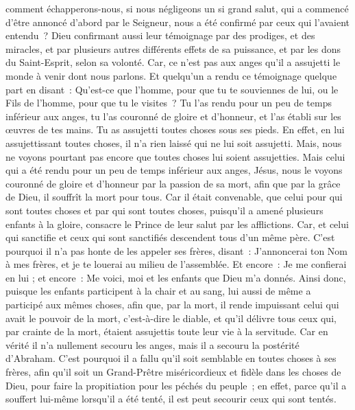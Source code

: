 \begin{multicols}{2}
comment échapperons-nous, si nous négligeons un si grand salut, qui a commencé d'être annoncé d'abord par le Seigneur, nous a été confirmé par ceux qui l'avaient entendu~?
Dieu confirmant aussi leur témoignage par des prodiges, et des miracles, et par plusieurs autres différents effets de sa puissance, et par les dons du Saint-Esprit, selon sa volonté.
Car, ce n'est pas aux anges qu'il a assujetti le monde à venir dont nous parlons.
Et quelqu'un a rendu ce témoignage quelque part en disant~: Qu'est-ce que l'homme, pour que tu te souviennes de lui, ou le Fils de l'homme, pour que tu le visites~?
Tu l'as rendu pour un peu de temps inférieur aux anges, tu l'as couronné de gloire et d'honneur, et l'as établi sur les œuvres de tes mains.
Tu as assujetti toutes choses sous ses pieds. En effet, en lui assujettissant toutes choses, il n'a rien laissé qui ne lui soit assujetti. Mais, nous ne voyons pourtant pas encore que toutes choses lui soient assujetties.
Mais celui qui a été rendu pour un peu de temps inférieur aux anges, Jésus, nous le voyons couronné de gloire et d'honneur par la passion de sa mort, afin que par la grâce de Dieu, il souffrît la mort pour tous.
Car il était convenable, que celui pour qui sont toutes choses et par qui sont toutes choses, puisqu'il a amené plusieurs enfants à la gloire, consacre le Prince de leur salut par les afflictions.
Car, et celui qui sanctifie et ceux qui sont sanctifiés descendent tous d'un même père. C'est pourquoi il n'a pas honte de les appeler ses frères,
disant~: J'annoncerai ton Nom à mes frères, et je te louerai au milieu de l'assemblée.
Et encore~: Je me confierai en lui ; et encore~: Me voici, moi et les enfants que Dieu m'a donnés.
Ainsi donc, puisque les enfants participent à la chair et au sang, lui aussi de même a participé aux mêmes choses, afin que, par la mort, il rende impuissant celui qui avait le pouvoir de la mort, c'est-à-dire le diable,
et qu'il délivre tous ceux qui, par crainte de la mort, étaient assujettis toute leur vie à la servitude.
Car en vérité il n'a nullement secouru les anges, mais il a secouru la postérité d'Abraham.
C'est pourquoi il a fallu qu'il soit semblable en toutes choses à ses frères, afin qu'il soit un Grand-Prêtre miséricordieux et fidèle dans les choses de Dieu, pour faire la propitiation pour les péchés du peuple~;
en effet, parce qu'il a souffert lui-même lorsqu'il a été tenté, il est peut secourir ceux qui sont tentés.

\end{multicols}
